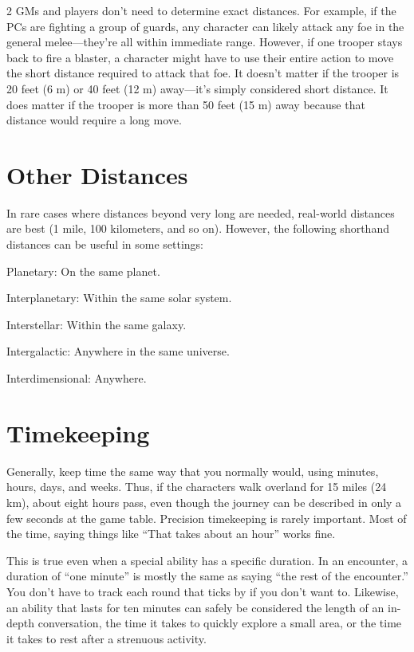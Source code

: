 \begin{multicols}{2}
GMs and players don’t need to determine exact distances. For example, if the PCs are fighting a group of guards, any character can likely attack any foe in the general melee—they’re all within immediate range. However, if one trooper stays back to fire a blaster, a character might have to use their entire action to move the short distance required to attack that foe. It doesn’t matter if the trooper is 20 feet (6 m) or 40 feet (12 m) away—it’s simply considered short distance. It does matter if the trooper is more than 50 feet (15 m) away because that distance would require a long move.

\section{Other Distances}

In rare cases where distances beyond very long are needed, real-world distances are best (1 mile, 100 kilometers, and so on). However, the following shorthand distances can be useful in some settings: 

Planetary: On the same planet.

Interplanetary: Within the same solar system.

Interstellar: Within the same galaxy.

Intergalactic: Anywhere in the same universe.

Interdimensional: Anywhere.

\section{Timekeeping}

Generally, keep time the same way that you normally would, using minutes, hours, days, and weeks. Thus, if the characters walk overland for 15 miles (24 km), about eight hours pass, even though the journey can be described in only a few seconds at the game table. Precision timekeeping is rarely important. Most of the time, saying things like “That takes about an hour” works fine.

This is true even when a special ability has a specific duration. In an encounter, a duration of “one minute” is mostly the same as saying “the rest of the encounter.” You don’t have to track each round that ticks by if you don’t want to. Likewise, an ability that lasts for ten minutes can safely be considered the length of an in-depth conversation, the time it takes to quickly explore a small area, or the time it takes to rest after a strenuous activity.

\end{multicols}

